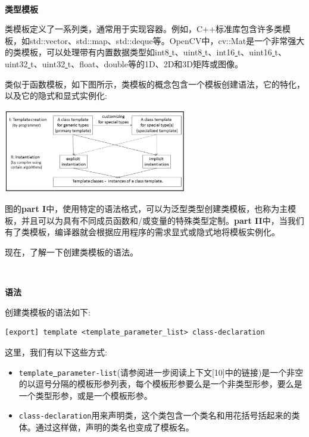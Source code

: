\noindent\textbf{}\ \par
\textbf{类型模板} \ \par
类模板定义了一系列类，通常用于实现容器。例如，C++标准库包含许多类模板，如std::vector、std::map、std::deque等。OpenCV中，cv::Mat是一个非常强大的类模板，可以处理带有内置数据类型如int8\underline{ }t、uint8\underline{ }t、int16\underline{ }t、uint16\underline{ }t、uint32\underline{ }t、uint32\underline{ }t、float、double等的1D、2D和3D矩阵或图像。 \par
类似于函数模板，如下图所示，类模板的概念包含一个模板创建语法，它的特化，以及它的隐式和显式实例化: \par

\begin{center}
	\includegraphics[width=0.6\textwidth]{content/Section-1/Chapter-4/2}
\end{center}

图的\textbf{part I}中，使用特定的语法格式，可以为泛型类型创建类模板，也称为主模板，并且可以为具有不同成员函数和/或变量的特殊类型定制。\textbf{part II}中，当我们有了类模板，编译器就会根据应用程序的需求显式或隐式地将模板实例化。\par
现在，了解一下创建类模板的语法。 \par

\noindent\textbf{}\ \par
\textbf{语法} \ \par
创建类模板的语法如下: \par

\begin{lstlisting}[caption={}]
[export] template <template_parameter_list> class-declaration
\end{lstlisting}

这里，我们有以下这些方式: \par

\begin{itemize}
	\item \texttt{template\underline{ }parameter-list}(请参阅进一步阅读上下文[10]中的链接)是一个非空的以逗号分隔的模板形参列表，每个模板形参要么是一个非类型形参，要么是一个类型形参，或是一个模板形参。
	\item \texttt{class-declaration}用来声明类，这个类包含一个类名和用花括号括起来的类体。通过这样做，声明的类名也变成了模板名。
\end{itemize}

